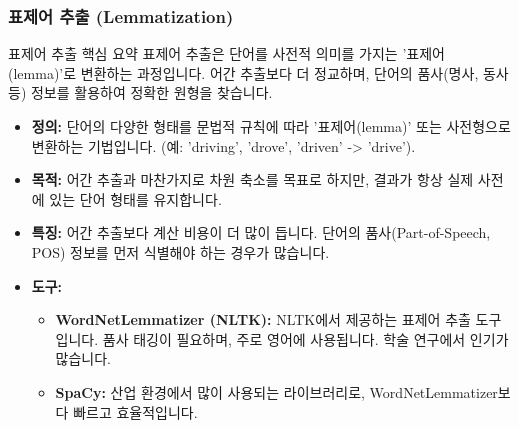 \documentclass[11pt,a4paper]{article}
\begin{document}
\subsubsection{표제어 추출 (Lemmatization)}
\begin{summarybox}{표제어 추출 핵심 요약}
표제어 추출은 단어를 사전적 의미를 가지는 '표제어(lemma)'로 변환하는 과정입니다. 어간 추출보다 더 정교하며, 단어의 품사(명사, 동사 등) 정보를 활용하여 정확한 원형을 찾습니다.
\end{summarybox}

\begin{itemize}
    \item \textbf{정의:} 단어의 다양한 형태를 문법적 규칙에 따라 '표제어(lemma)' 또는 사전형으로 변환하는 기법입니다. (예: 'driving', 'drove', 'driven' -> 'drive').
    \item \textbf{목적:} 어간 추출과 마찬가지로 차원 축소를 목표로 하지만, 결과가 항상 실제 사전에 있는 단어 형태를 유지합니다.
    \item \textbf{특징:} 어간 추출보다 계산 비용이 더 많이 듭니다. 단어의 품사(Part-of-Speech, POS) 정보를 먼저 식별해야 하는 경우가 많습니다.
    \item \textbf{도구:}
        \begin{itemize}
            \item \textbf{WordNetLemmatizer (NLTK):} NLTK에서 제공하는 표제어 추출 도구입니다. 품사 태깅이 필요하며, 주로 영어에 사용됩니다. 학술 연구에서 인기가 많습니다.
            \item \textbf{SpaCy:} 산업 환경에서 많이 사용되는 라이브러리로, WordNetLemmatizer보다 빠르고 효율적입니다.
        \end{itemize}
\end{itemize}
\end{document}
